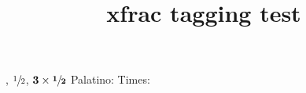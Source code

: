 \documentclass{article}
\title{xfrac tagging test}
\begin{document}
, $\sfrac{1}{2}$,
$\mathbf{3\times\sfrac{1}{2}}$
\quad {}\selectfont Palatino: 
\quad {}\selectfont Times: 
\end{document}
